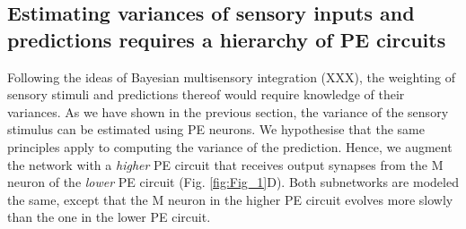 \documentclass[10pt,a4paper,draft]{article}
\begin{document}
\subsection*{Estimating variances of sensory inputs and predictions requires a hierarchy of PE circuits}
%
Following the ideas of Bayesian multisensory integration (XXX), the weighting of sensory stimuli and predictions thereof would require knowledge of their variances. As we have shown in the previous section, the variance of the sensory stimulus can be estimated using PE neurons. We hypothesise that the same principles apply to computing the variance of the prediction. Hence, we augment the network with a \textit{higher} PE circuit that receives output synapses from the M neuron of the \textit{lower} PE circuit (Fig. \ref{fig:Fig_1}D). Both subnetworks are modeled the same, except that the M neuron in the higher PE circuit evolves more slowly than the one in the lower PE circuit. 
%
\end{document}
